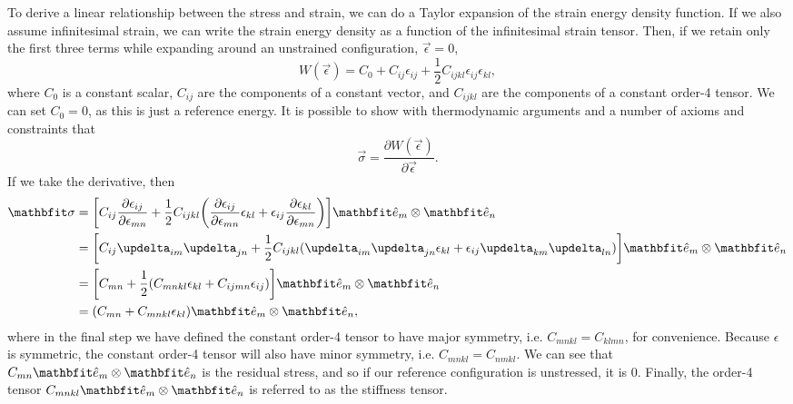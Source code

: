 To derive a linear relationship between the stress and strain, we can do a Taylor expansion of the strain energy density function.
If we also assume infinitesimal strain, we can write the strain energy density as a function of the infinitesimal strain tensor.
Then, if we retain only the first three terms while expanding around an unstrained configuration, $\vec{\epsilon} = 0$,
\begin{equation}
    W(\vec{\epsilon}) = C_{0} + C_{ij} \epsilon_{ij} + \frac{1}{2} C_{ijkl} \epsilon_{ij} \epsilon_{kl},
\end{equation}
where $C_0$ is a constant scalar, $C_{ij}$ are the components of a constant vector, and $C_{ijkl}$ are the components of a constant order-4 tensor.
We can set $C_0 = 0$, as this is just a reference energy.
It is possible to show with thermodynamic arguments and a number of axioms and constraints that
\begin{equation}
    \vec{\sigma} = \frac{\partial W(\vec{\epsilon})}{\partial \vec{\epsilon}}.
\end{equation}
If we take the derivative, then
\begin{align}
    \vec{\sigma} &= \mleft[ C_{ij} \frac{\partial \epsilon_{ij}}{\partial \epsilon_{mn}} + \frac{1}{2} C_{ijkl} \mleft( \frac{\partial \epsilon_{ij}}{\partial \epsilon_{mn}} \epsilon_{kl} + \epsilon_{ij} \frac{\partial \epsilon_{kl}}{\partial \epsilon_{mn}} \mright) \mright] \unitvec_{m} \otimes \unitvec_{n} \nonumber\\
                &= \mleft[ C_{ij} \updelta_{im} \updelta_{jn} + \frac{1}{2} C_{ijkl} ( \updelta_{im} \updelta_{jn} \epsilon_{kl} + \epsilon_{ij} \updelta_{km} \updelta_{ln} ) \mright] \unitvec_{m} \otimes \unitvec_{n} \nonumber\\
                &= \mleft[ C_{mn} + \frac{1}{2} (C_{mnkl} \epsilon_{kl} + C_{ijmn} \epsilon_{ij} ) \mright] \unitvec_{m} \otimes \unitvec_{n} \nonumber\\
                &= \mleft( C_{mn} + C_{mnkl} \epsilon_{kl} \mright) \unitvec_{m} \otimes \unitvec_{n},
\end{align}
where in the final step we have defined the constant order-4 tensor to have major symmetry, i.e. $C_{mnkl} = C_{klmn}$, for convenience.
Because $\epsilon$ is symmetric, the constant order-4 tensor will also have minor symmetry, i.e. $C_{mnkl} = C_{nmkl}$.
We can see that $C_{mn} \unitvec_{m} \otimes \unitvec_{n}$ is the residual stress, and so if our reference configuration is unstressed, it is 0.
Finally, the order-4 tensor $C_{mnkl} \unitvec_{m} \otimes \unitvec_{n}$ is referred to as the stiffness tensor.

